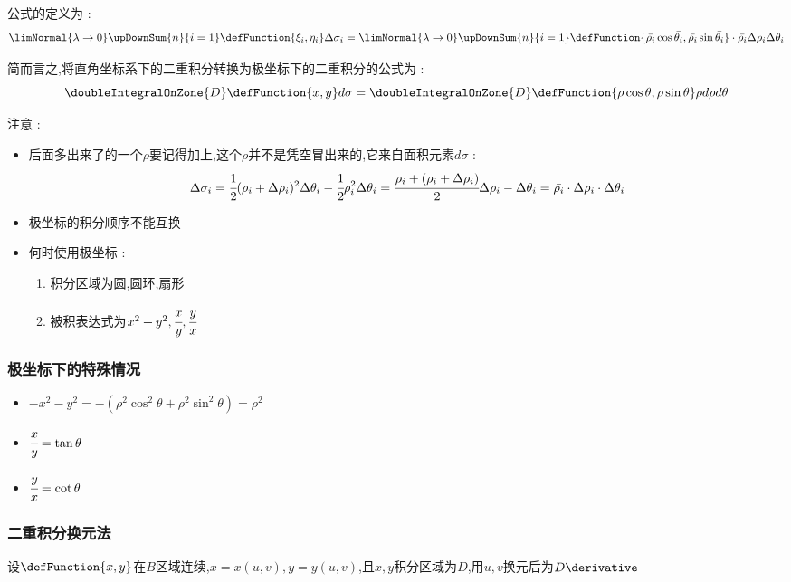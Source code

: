 {{{    公式的定义为 :
    $$
      \limNormal{\lambda \to 0}\upDownSum{n}{i = 1}\defFunction{\xi_i,\eta_i}\Delta\sigma_i = \limNormal{\lambda \to 0}\upDownSum{n}{i = 1}\defFunction{\bar{\rho_i}\cos\bar{\theta_i}, \bar{\rho_i}\sin\bar{\theta_i}}\cdot\bar{\rho_i}\Delta\rho_i\Delta\theta_i
    $$

    简而言之,将直角坐标系下的二重积分转换为极坐标下的二重积分的公式为 :
    $$
      \doubleIntegralOnZone{D}\defFunction{x,y}d\sigma = \doubleIntegralOnZone{D}\defFunction{\rho\cos\theta,\rho\sin\theta}\rho d\rho d\theta
    $$

    注意 :
    \begin{itemize}
      \item {
            后面多出来了的一个$\rho$要记得加上,这个$\rho$并不是凭空冒出来的,它来自面积元素$d\sigma$ :
            $$
              \Delta\sigma_i = \cfrac{1}{2}(\rho_i + \Delta\rho_i)^2\Delta\theta_i - \cfrac{1}{2}\rho_i^2\Delta\theta_i = \cfrac{\rho_i + (\rho_i + \Delta\rho_i)}{2}\Delta\rho_i - \Delta\theta_i = \bar{\rho_i}\cdot\Delta\rho_i\cdot\Delta\theta_i
            $$
            }
      \item {
            极坐标的积分顺序不能互换
            }
      \item{
            何时使用极坐标 :
            \begin{enumerate}
              \item 积分区域为圆,圆环,扇形
              \item 被积表达式为$x^2 + y^2,\cfrac{x}{y},\cfrac{y}{x}$
            \end{enumerate}
            }
    \end{itemize}

  }%

  \subsubsection{极坐标下的特殊情况}{
    \begin{itemize}
      \item $-x^2 -y^2 = -(\rho^2\cos^2\theta + \rho^2\sin^2\theta) = \rho^2$
      \item $\cfrac{x}{y} = \tan\theta$
      \item $\cfrac{y}{x} = \cot\theta$
    \end{itemize}
  }%

  \subsubsection{二重积分换元法}{
    设$\defFunction{x,y}$在$B$区域连续,$x = x(u,v),y = y(u,v)$,且$x,y$积分区域为$D$,用$u,v$换元后为$D\derivative$\\

}}}
